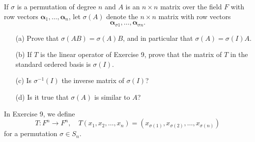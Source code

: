 \begin{problem}
If $\sigma$ is a permutation of degree $n$ and $A$ is an $n \times n$ matrix over the field $F$ with row vectors $\boldsymbol{\alpha}_1, \dots, \boldsymbol{\alpha}_n$, let $\sigma(A)$ denote the $n \times n$ matrix with row vectors
$$
\boldsymbol{\alpha}_{\sigma 1}, \dots, \boldsymbol{\alpha}_{\sigma n}.
$$
\begin{enumerate}
    \item[(a)] Prove that $\sigma(AB) = \sigma(A)B$, and in particular that $\sigma(A) = \sigma(I)A$.
    \item[(b)] If $T$ is the linear operator of Exercise 9, prove that the matrix of $T$ in the standard ordered basis is $\sigma(I)$.
    \item[(c)] Is $\sigma^{-1}(I)$ the inverse matrix of $\sigma(I)$?
    \item[(d)] Is it true that $\sigma(A)$ is similar to $A$?
\end{enumerate}

\begin{note}
    In Exercise 9, we define
    \[
        T:F^n \to F^n, \quad T(x_1, x_2, \dots , x_n) = \left( x_{\sigma (1)}, x_{\sigma (2)}, \dots , x_{\sigma (n)} \right) 
    \] for a permutation \(\sigma \in S_n\). 
\end{note}
\end{problem}
